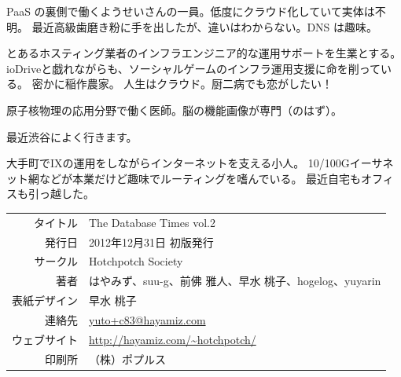 \documentclass[b5paper,papersize,tombow,10pt]{jsbook}
\begin{document}
 \quad
PaaS の裏側で働くようせいさんの一員。低度にクラウド化していて実体は不明。
最近高級歯磨き粉に手を出したが、違いはわからない。DNS は趣味。

 \quad
とあるホスティング業者のインフラエンジニア的な運用サポートを生業とする。
ioDriveと戯れながらも、ソーシャルゲームのインフラ運用支援に命を削っている。
密かに稲作農家。
人生はクラウド。厨二病でも恋がしたい！

 \quad
原子核物理の応用分野で働く医師。脳の機能画像が専門（のはず）。

 \quad
最近渋谷によく行きます。

 \quad
大手町でIXの運用をしながらインターネットを支える小人。
10/100Gイーサネット網などが本業だけど趣味でルーティングを嗜んでいる。
最近自宅もオフィスも引っ越した。

\vspace*{16\Cvs}

\begin{center}
 \par\vspace*{1mm}
 \begin{tabular}{rl}
  \hline
  タイトル & The Database Times vol.2 \\
  発行日 & 2012年12月31日 初版発行 \\
  サークル & Hotchpotch Society \\
  著者 & はやみず、suu-g、前佛 雅人、早水 桃子、hogelog、yuyarin \\
  表紙デザイン & 早水 桃子 \\
  連絡先 & \url{yuto+c83@hayamiz.com} \\
  ウェブサイト & \url{http://hayamiz.com/~hotchpotch/} \\
  印刷所 & （株）ポプルス \\
  \hline
 \end{tabular}
\end{center}
\end{document}
